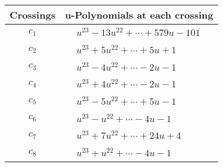 \documentclass[1p]{elsarticle_modified}
\theoremstyle{definition}
\begin{document}
\begin{tabular}{m{50pt}|m{274pt}}
Crossings & \hspace{64pt}u-Polynomials at each crossing \\
\hline $$\begin{aligned}c_{1}\end{aligned}$$&$\begin{aligned}
&u^{23}-13 u^{22}+\cdots+579 u-101
\end{aligned}$\\
\hline $$\begin{aligned}c_{2}\end{aligned}$$&$\begin{aligned}
&u^{23}+5 u^{22}+\cdots+5 u+1
\end{aligned}$\\
\hline $$\begin{aligned}c_{3}\end{aligned}$$&$\begin{aligned}
&u^{23}-4 u^{22}+\cdots-2 u-1
\end{aligned}$\\
\hline $$\begin{aligned}c_{4}\end{aligned}$$&$\begin{aligned}
&u^{23}+4 u^{22}+\cdots-2 u-1
\end{aligned}$\\
\hline $$\begin{aligned}c_{5}\end{aligned}$$&$\begin{aligned}
&u^{23}-5 u^{22}+\cdots+5 u-1
\end{aligned}$\\
\hline $$\begin{aligned}c_{6}\end{aligned}$$&$\begin{aligned}
&u^{23}- u^{22}+\cdots-4 u-1
\end{aligned}$\\
\hline $$\begin{aligned}c_{7}\end{aligned}$$&$\begin{aligned}
&u^{23}+7 u^{22}+\cdots+24 u+4
\end{aligned}$\\
\hline $$\begin{aligned}c_{8}\end{aligned}$$&$\begin{aligned}
&u^{23}+u^{22}+\cdots-4 u-1
\end{aligned}$\\

\end{tabular}
\end{document}
